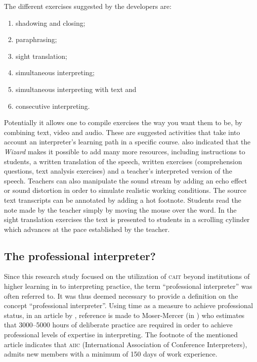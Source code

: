 \documentclass[output=paper]{langsci/langscibook}
\begin{document}
The different exercises suggested by the developers are:

\begin{enumerate}[label=\alph*.]
\item shadowing and closing; 
\item paraphrasing; 
\item sight translation; 
\item simultaneous interpreting; 
\item simultaneous interpreting with text and 
\item consecutive interpreting. 
\end{enumerate}

\noindent Potentially it allows one to compile exercises the way you want them to be, by combining text, video and audio. These are suggested activities that take into account an interpreter’s learning path in a specific course. \citet[10]{Sandrelli2007a} also indicated that the \textit{Wizard} makes it possible to add many more resources, including instructions to students, a written translation of the speech, written exercises (comprehension questions, text analysis exercises) and a teacher’s interpreted version of the speech. Teachers can also manipulate the sound stream by adding an echo effect or sound distortion in order to simulate realistic working conditions. The source text transcripts can be annotated by adding a hot footnote. Students read the note made by the teacher simply by moving the mouse over the word. In the sight translation exercises the text is presented to students in a scrolling cylinder which advances at the pace established by the teacher. 

\subsection{The professional interpreter?}
Since this research study focused on the utilization of \textsc{cait} beyond institutions of higher learning in to interpreting practice, the term “professional interpreter” was often referred to. It was thus deemed necessary to provide a definition on the concept “professional interpreter”. Using time as a measure to achieve professional status, in an article by \citet[115]{Sandrelli2015}, reference is made to Moser-Mercer (in \citealt{Motta2006}) who estimates that 3000--5000 hours of deliberate practice are required in order to achieve professional levels of expertise in interpreting. The footnote of the mentioned article indicates that \textsc{aiic} (International Association of Conference Interpreters), admits new members with a minimum of 150 days of work experience.
\end{document}

